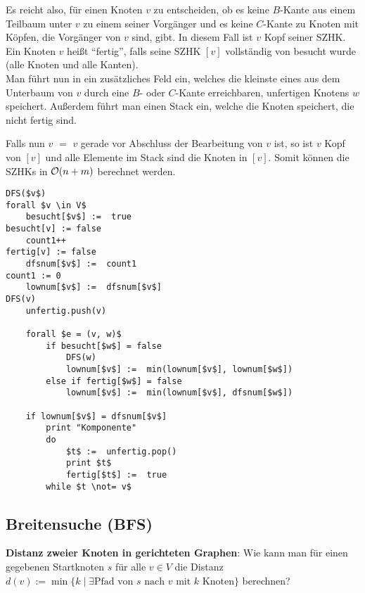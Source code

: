 \linie

Es reicht also, für einen Knoten $v$ zu entscheiden, ob es keine $B$-Kante
aus einem Teilbaum unter $v$ zu einem seiner Vorgänger und es keine $C$-Kante
zu Knoten mit Köpfen, die Vorgänger von $v$ sind, gibt.
In diesem Fall ist $v$ Kopf seiner SZHK. \\
Ein Knoten $v$ heißt "`fertig"', falls seine SZHK $[v]$ vollständig von
 besucht wurde (alle Knoten und alle Kanten). \\
Man führt nun in  ein zusätzliches Feld  ein, welches
die kleinste  eines aus dem Unterbaum von $v$ durch eine
$B$- oder $C$-Kante erreichbaren, unfertigen Knotens $w$ speichert.
Außerdem führt man einen Stack  ein, welche die Knoten
speichert, die nicht fertig sind.

Falls nun \code{dfsnum[}$v$\code{]} $=$ \code{lownum[}$v$\code{]} gerade
vor Abschluss der Bearbeitung von $v$\code{)} ist,
so ist $v$ Kopf von $[v]$ und alle Elemente im Stack  sind
die Knoten in $[v]$.
Somit können die SZHKs in $\mathcal{O}(n + m)$ berechnet werden.

\begin{lstlisting}
DFS($v$)                                                                  forall $v \in V$
    besucht[$v$] :=  true                                                      besucht[v] := false
    count1++                                                               fertig[v] := false
    dfsnum[$v$] :=  count1                                                     count1 := 0
    lownum[$v$] :=  dfsnum[$v$]                                                   DFS(v)
    unfertig.push(v)
    
    forall $e = (v, w)$
        if besucht[$w$] = false
            DFS(w)
            lownum[$v$] :=  min(lownum[$v$], lownum[$w$])
        else if fertig[$w$] = false
            lownum[$v$] :=  min(lownum[$v$], dfsnum[$w$])
    
    if lownum[$v$] = dfsnum[$v$]
        print "Komponente"
        do
            $t$ :=  unfertig.pop()
            print $t$
            fertig[$t$] :=  true
        while $t \not= v$
\end{lstlisting}

\subsection{%
    Breitensuche (BFS)%
}

\textbf{Distanz zweier Knoten in gerichteten Graphen}:
Wie kann man für einen gegebenen Startknoten $s$ für alle $v \in V$ die
Distanz $d(v) := \min\{k \;|\; \exists\text{Pfad von } s \text{ nach } v
\text{ mit } k \text{ Knoten}\}$ berechnen?

